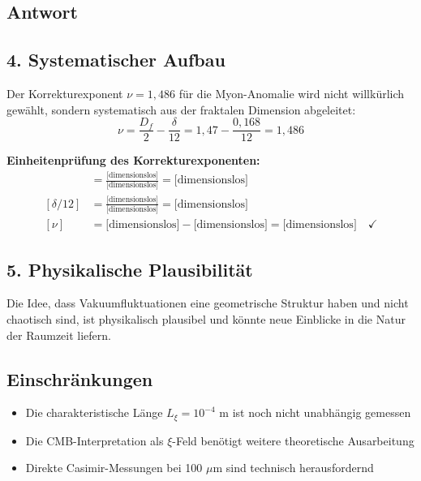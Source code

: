 \documentclass[12pt,a4paper]{article}
\newcommand{\nulep}{\nu}
\theoremstyle{remark}
\newenvironment{answer}{\subsection*{Antwort}}{\vspace{1em}}
\begin{document}
\begin{answer}
	\subsection{4. Systematischer Aufbau}
	
	Der Korrekturexponent $\nulep = 1{,}486$ für die Myon-Anomalie wird nicht willkürlich gewählt, sondern systematisch aus der fraktalen Dimension abgeleitet:
	\begin{equation}
		\nulep = \frac{D_f}{2} - \frac{\delta}{12} = 1{,}47 - \frac{0{,}168}{12} = 1{,}486
	\end{equation}
	
	\begin{units}
		\textbf{Einheitenprüfung des Korrekturexponenten:}
		\begin{align}
			[D_f/2] &= \frac{\text{[dimensionslos]}}{\text{[dimensionslos]}} = \text{[dimensionslos]} \\
			[\delta/12] &= \frac{\text{[dimensionslos]}}{\text{[dimensionslos]}} = \text{[dimensionslos]} \\
			[\nulep] &= \text{[dimensionslos]} - \text{[dimensionslos]} = \text{[dimensionslos]} \quad \checkmark
		\end{align}
	\end{units}
	
	\subsection{5. Physikalische Plausibilität}
	
	Die Idee, dass Vakuumfluktuationen eine geometrische Struktur haben und nicht chaotisch sind, ist physikalisch plausibel und könnte neue Einblicke in die Natur der Raumzeit liefern.
	
	\subsection{Einschränkungen}
	
	\begin{itemize}
		\item Die charakteristische Länge $L_\xi = 10^{-4}$ m ist noch nicht unabhängig gemessen
		\item Die CMB-Interpretation als $\xi$-Feld benötigt weitere theoretische Ausarbeitung
		\item Direkte Casimir-Messungen bei 100 $\mu$m sind technisch herausfordernd
	\end{itemize}
\end{answer}
\end{document}

